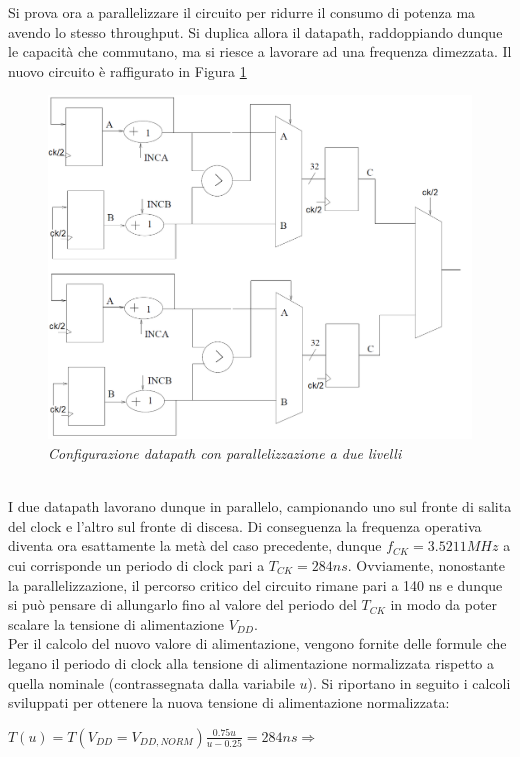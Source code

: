 \newpage
\noindent Si prova ora a parallelizzare il circuito per ridurre il consumo di potenza ma avendo lo stesso throughput. Si duplica allora il datapath, raddoppiando dunque le capacità che commutano, ma si riesce a lavorare ad una frequenza dimezzata. Il nuovo circuito è raffigurato in Figura \ref{circuito_parallel}
\begin{figure}[!htb]
	\centering
	\includegraphics[scale=0.8]{immagini/circuito_parallel}
	\caption{\textit{Configurazione datapath con parallelizzazione a due livelli}}
	\label{circuito_parallel}
\end{figure}
\\
I due datapath lavorano dunque in parallelo, campionando uno sul fronte di salita del clock e l'altro sul fronte di discesa. Di conseguenza la frequenza operativa diventa ora esattamente la metà del caso precedente, dunque $f_{CK}=3.5211 MHz$ a cui corrisponde un periodo di clock pari a $T_{CK}=284 ns$. Ovviamente, nonostante la parallelizzazione, il percorso critico del circuito rimane pari a 140 ns e dunque si può pensare di allungarlo fino al valore del periodo del $T_{CK}$ in modo da poter scalare la tensione di alimentazione $V_{DD}$.\\
Per il calcolo del nuovo valore di alimentazione, vengono fornite delle formule che legano il periodo di clock alla tensione di alimentazione normalizzata rispetto a quella nominale (contrassegnata dalla variabile $u$). Si riportano in seguito i calcoli sviluppati per ottenere la nuova tensione di alimentazione normalizzata:
\begin{center}
	$T(u)=T(V_{DD}=V_{DD, NORM})\frac{0.75u}{u-0.25}=284 ns \Longrightarrow$
\end{center}

